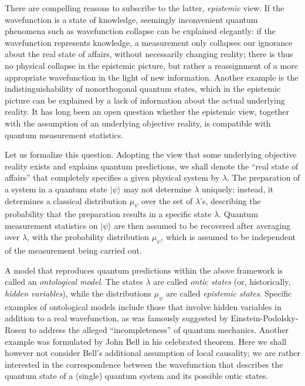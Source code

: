 \documentclass[aps,prl,floatfix,twocolumn,tightenlines,amsmath,amssymb,nofootinbib]{revtex4-1}
\newcommand{\ket}[1] {| #1 \rangle}
\begin{document}
There are compelling reasons to subscribe to the latter, \emph{epistemic} view\cite{Spekkens2007}.
If the wavefunction is a state of knowledge, seemingly inconvenient quantum phenomena such as wavefunction collapse can be explained elegantly: if the wavefunction represents knowledge, a measurement only collapses our ignorance about the real state of affairs, without necessarily changing reality; there is thus no physical collapse in the epistemic picture, but rather a reassignment of a more appropriate wavefunction in the light of new information. Another example is the indistinguishability of nonorthogonal quantum states, which in the epistemic picture can be explained by a lack of information about the actual underlying reality. It has long been an open question whether the epistemic view, together with the assumption of an underlying objective reality, is compatible with quantum measurement statistics.

Let us formalize this question. Adopting the view that some underlying objective reality exists and explains quantum predictions, we shall denote the ``real state of affairs'' that completely specifies a given physical system by $\lambda$. 
The preparation of a system in a quantum state $\ket{\psi}$ may not determine $\lambda$ uniquely; instead, it determines a classical distribution $\mu_\psi$ over the set of $\lambda$'s, describing the probability that the preparation results in a specific state $\lambda$. Quantum measurement statistics on $\ket{\psi}$ are then assumed to be recovered after averaging over $\lambda$, with the probability distribution $\mu_\psi$, which is assumed to be independent of the measurement being carried out.

A model that reproduces quantum predictions within the above framework is called an \emph{ontological model}\cite{Harrigan2010}. The states $\lambda$ are called \emph{ontic states} (or, historically, \emph{hidden variables}), while the distributions $\mu_\psi$ are called \emph{epistemic states}. Specific examples of ontological models include those that involve hidden variables in addition to a real wavefunction, as was famously suggested by Einstein-Podolsky-Rosen\cite{einstein1935cqm} to address the alleged ``incompleteness'' of quantum mechanics. Another example was formulated by John Bell in his celebrated theorem\cite{Bell1964}. Here we shall however not consider Bell's additional assumption of local causality\cite{RevModPhys.86.419}; we are rather interested in the correspondence between the wavefunction that describes the quantum state of a (single) quantum system and its possible ontic states.
\end{document}
